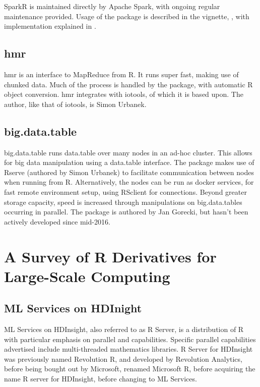 \documentclass[a4paper,10pt]{article}
\begin{document}
SparkR is maintained directly by Apache Spark, with ongoing regular
maintenance provided. Usage of the package is described in the
vignette, \textcite{venktaraman19:_spark_pract_guide}, with
implementation explained in \textcite{venkataraman2016sparkr}.

\subsection{hmr}
\label{sec:hmr}

hmr is an interface to MapReduce from R\cite{urbanek20}. It runs super
fast, making use of chunked data. Much of the process is handled by
the package, with automatic R object conversion. hmr integrates with
iotools, of which it is based upon. The author, like that of iotools,
is Simon Urbanek.

\subsection{big.data.table}
\label{sec:big.data.table}

big.data.table runs data.table over many nodes in an ad-hoc
cluster\cite{gorecki16}. This allows for big data manipulation using a
data.table interface. The package makes use of Rserve (authored by
Simon Urbanek) to facilitate communication between nodes when running
from R. Alternatively, the nodes can be run as docker services, for
fast remote environment setup, using RSclient for connections. Beyond
greater storage capacity, speed is increased through manipulations on
big.data.tables occurring in parallel. The package is authored by Jan
Gorecki, but hasn't been actively developed since mid-2016.

\section{A Survey of R Derivatives for Large-Scale Computing}

\subsection{ML Services on HDInight}
\label{sec:r-server-hdinsight}

ML Services on HDInsight, also referred to as R Server, is a
distribution of R with particular emphasis on parallel and
capabilities\cite{azure16:_r_server_hdins_r_analy}. Specific parallel
capabilities advertised include multi-threaded mathematics libraries.
R Server for HDInsight was previously named Revolution R, and
developed by Revolution Analytics, before being bought out by
Microsoft, renamed Microsoft R, before acquiring the name R server for
HDInsight, before changing to ML Services.
\end{document}
